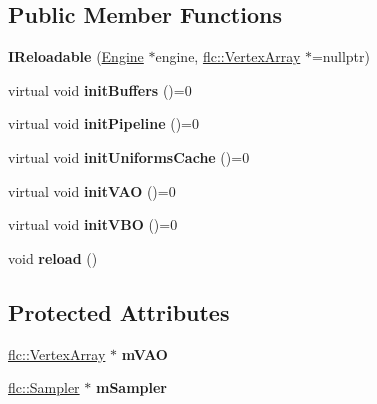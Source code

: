 \subsection*{Public Member Functions}
\begin{DoxyCompactItemize}
\item 
\mbox{\label{classflw_1_1flf_1_1IReloadable_ac731f61c6d138b0edcfaedbbfdaa532b}} 
{\bfseries I\+Reloadable} (\hyperlink{classflw_1_1Engine}{Engine} $\ast$engine, \hyperlink{classflw_1_1flc_1_1VertexArray}{flc\+::\+Vertex\+Array} $\ast$=nullptr)
\item 
\mbox{\label{classflw_1_1flf_1_1IReloadable_a8f95c0f4b89e86f07e5b84b920b52de5}} 
virtual void {\bfseries init\+Buffers} ()=0
\item 
\mbox{\label{classflw_1_1flf_1_1IReloadable_a955cc317fbf1e974c9721eba63d8b925}} 
virtual void {\bfseries init\+Pipeline} ()=0
\item 
\mbox{\label{classflw_1_1flf_1_1IReloadable_aaa10b7aa64b43307022ea9c96a3745d5}} 
virtual void {\bfseries init\+Uniforms\+Cache} ()=0
\item 
\mbox{\label{classflw_1_1flf_1_1IReloadable_ab7a74ae62026efd9a7c84285a2dda781}} 
virtual void {\bfseries init\+V\+AO} ()=0
\item 
\mbox{\label{classflw_1_1flf_1_1IReloadable_a93e45b66f1029e5fd95174b68fbc1114}} 
virtual void {\bfseries init\+V\+BO} ()=0
\item 
\mbox{\label{classflw_1_1flf_1_1IReloadable_a406820dd9f7ef66ca0df0dda52f666cd}} 
void {\bfseries reload} ()
\end{DoxyCompactItemize}
\subsection*{Protected Attributes}
\begin{DoxyCompactItemize}
\item 
\mbox{\label{classflw_1_1flf_1_1IReloadable_a9aca34153ac7f3a633591234cd603e04}} 
\hyperlink{classflw_1_1flc_1_1VertexArray}{flc\+::\+Vertex\+Array} $\ast$ {\bfseries m\+V\+AO}
\item 
\mbox{\label{classflw_1_1flf_1_1IReloadable_ad7e7e8c96385b0bc2f6c65e8a18c7806}} 
\hyperlink{classflw_1_1flc_1_1Sampler}{flc\+::\+Sampler} $\ast$ {\bfseries m\+Sampler}
\end{DoxyCompactItemize}


